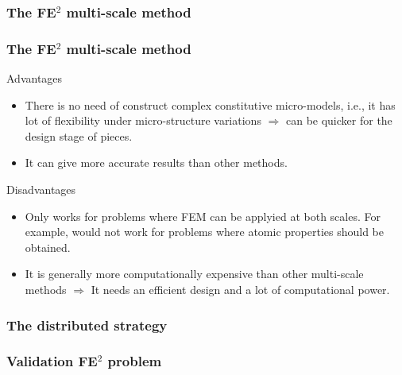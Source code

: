\documentclass[usenames,dvipsnames]{beamer}
\begin{document}

\begin{frame}
\frametitle{The FE$^2$ multi-scale method}

\begin{figure}[!ht]
\resizebox{1.0\linewidth}{!}{}
\end{figure}
\end{frame}


\begin{frame}
\frametitle{The FE$^2$ multi-scale method}
{\color{ForestGreen}Advantages}
\begin{itemize}
\item There is no need of construct complex constitutive micro-models, i.e., it has lot of flexibility under
micro-structure variations $\Rightarrow$ can be quicker for the design
stage of pieces.
\item It can give more accurate results than other methods.
\end{itemize}

{\color{Red}Disadvantages}
\begin{itemize}
\item Only works for problems where FEM can be applyied at both scales. For example, would not work for problems where atomic
properties should be obtained.
\item It is generally more computationally expensive than other multi-scale methods $\Rightarrow$ It needs an efficient
design and a lot of computational power. 
\end{itemize}
\end{frame}


\begin{frame}
\frametitle{The distributed strategy}

\begin{figure}[!ht]
\resizebox{1.0\linewidth}{!}{}
\end{figure}
\end{frame}


\begin{frame}
\frametitle{Validation FE$^2$ problem}
\begin{figure}[!ht]
\resizebox{0.8\linewidth}{!}{}
\end{figure}
\end{frame}
\end{document}
